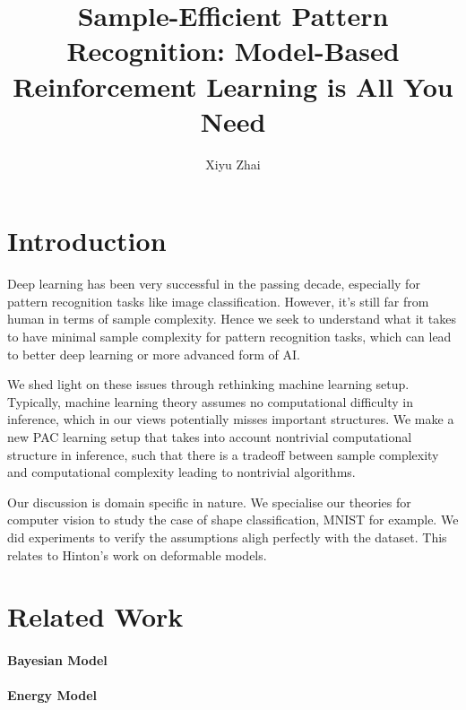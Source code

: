 \documentclass[11pt, oneside]{article}   	%
\title{Sample-Efficient Pattern Recognition: Model-Based Reinforcement Learning is All You Need}
\author{Xiyu Zhai}
\date{}							%
\theoremstyle{definition}
\begin{document}
\maketitle
\tableofcontents
{}

\section{Introduction}

Deep learning has been very successful in the passing decade, especially for pattern recognition tasks like image classification. However, it's still far from human in terms of sample complexity. Hence we seek to understand what it takes to have minimal sample complexity for pattern recognition tasks, which can lead to better deep learning or more advanced form of AI.

We shed light on these issues through rethinking machine learning setup. Typically, machine learning theory assumes no computational difficulty in inference, which in our views potentially misses important structures. We make a new PAC learning setup that takes into account nontrivial computational structure in inference, such that there is a tradeoff between sample complexity and computational complexity leading to nontrivial algorithms. 

Our discussion is domain specific in nature. We specialise our theories for computer vision to study the case of shape classification, MNIST for example. We did experiments to verify the assumptions aligh perfectly with the dataset. This relates to Hinton's work on deformable models.

\section{Related Work}

\paragraph{Bayesian Model}

\paragraph{Energy Model}
\end{document}

